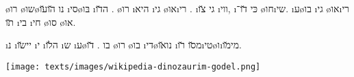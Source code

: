 \o{רו} \o{שו}\o{נו} \u{הו}\u{עו}  \i{סי}\o{בּו} \i{ה}\u{דו}  \dinozaurim. \o{רו}  \i{היא} \i{גי} \o{או}\i{רי} . \i{גי}     \u{צו} \i{ווי},  \i{כּי}  \u{דו}־      \o{חו}\i{שי}. \i{ע}\o{בו} \i{גי} \o{או}\i{רי} \u{תו} \i{בי} \i{חי}  \o{סו} \o{או}.

 \i{נ} \i{יי}\u{שו}  \i{י} \i{ה}\u{לו} \i{ש}  \i{ע}\o{בו} \dinozaurim. \u{דו} \o{רו}  \o{בו}  \i{די}\o{נו}\u{או} \i{מ}\u{סו} \u{רו}\i{טי}\o{ו}\i{מי}\u{מו}.

\begin{center}
	\texttt{[image: texts/images/wikipedia-dinozaurim-godel.png]}
\end{center}
